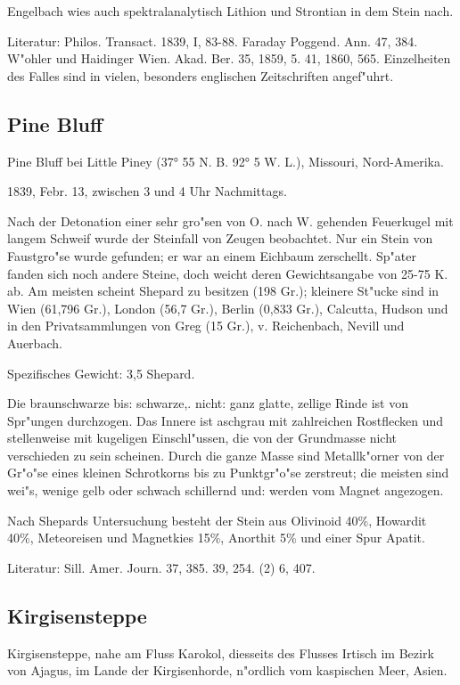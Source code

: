 \documentclass[a4paper, 11pt, oneside]{article}
\begin{document}
Engelbach wies auch spektralanalytisch Lithion und Strontian in dem Stein nach.

Literatur: Philos. Transact. 1839, I, 83-88. Faraday Poggend. Ann. 47, 384. W"ohler und Haidinger Wien. Akad. Ber. 35, 1859, 5. 41, 1860, 565. Einzelheiten des Falles sind in vielen, besonders englischen Zeitschriften angef"uhrt.

\subsection{Pine Bluff}

Pine Bluff bei Little Piney (37° 55 N. B. 92° 5 W. L.), Missouri, Nord-Amerika.

1839, Febr. 13, zwischen 3 und 4 Uhr Nachmittags.

Nach der Detonation einer sehr gro"sen von O. nach W. gehenden Feuerkugel mit langem Schweif wurde der Steinfall von Zeugen beobachtet. Nur ein Stein von Faustgro"se wurde gefunden; er war an einem Eichbaum zerschellt. Sp"ater fanden sich noch andere Steine, doch weicht deren Gewichtsangabe von 25-75 K. ab. Am meisten scheint Shepard zu besitzen (198 Gr.); kleinere St"ucke sind in Wien (61,796 Gr.), London (56,7 Gr.), Berlin (0,833 Gr.), Calcutta, Hudson und in den Privatsammlungen von Greg (15 Gr.), v. Reichenbach, Nevill und Auerbach.

Spezifisches Gewicht: 3,5 Shepard.

Die braunschwarze bis: schwarze,. nicht: ganz glatte, zellige Rinde ist von Spr"ungen durchzogen. Das Innere ist aschgrau mit zahlreichen Rostflecken und stellenweise mit kugeligen Einschl"ussen, die von der Grundmasse nicht verschieden zu sein scheinen. Durch die ganze Masse sind Metallk"orner von der Gr"o"se eines kleinen Schrotkorns bis zu Punktgr"o"se zerstreut; die meisten sind wei"s, wenige gelb oder schwach schillernd und: werden vom Magnet angezogen.

Nach Shepards Untersuchung besteht der Stein aus Olivinoid 40\%, Howardit 40\%, Meteoreisen und Magnetkies 15\%, Anorthit 5\% und einer Spur Apatit.

Literatur: Sill. Amer. Journ. 37, 385. 39, 254. (2) 6, 407.

\subsection{Kirgisensteppe}

Kirgisensteppe, nahe am Fluss Karokol, diesseits des Flusses Irtisch im Bezirk von Ajagus, im Lande der Kirgisenhorde, n"ordlich vom kaspischen Meer, Asien.
\end{document}
